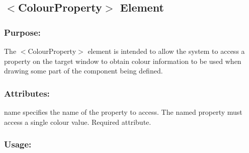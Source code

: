 \hypertarget{fal_element_ref_fal_elem_ref_sec_6}{}\subsection{$<$\+Colour\+Property$>$ Element}\label{fal_element_ref_fal_elem_ref_sec_6}
\hypertarget{fal_element_ref_fal_elem_ref_sec_6_1}{}\subsubsection{Purpose\+:}\label{fal_element_ref_fal_elem_ref_sec_6_1}
The {\ttfamily $<$Colour\+Property$>$} element is intended to allow the system to access a property on the target window to obtain colour information to be used when drawing some part of the component being defined.\hypertarget{fal_element_ref_fal_elem_ref_sec_6_2}{}\subsubsection{Attributes\+:}\label{fal_element_ref_fal_elem_ref_sec_6_2}
\begin{DoxyItemize}
\item {\ttfamily name} specifies the name of the property to access. The named property must access a single colour value. Required attribute.\end{DoxyItemize}
\hypertarget{fal_element_ref_fal_elem_ref_sec_6_3}{}\subsubsection{Usage\+:}\label{fal_element_ref_fal_elem_ref_sec_6_3}


